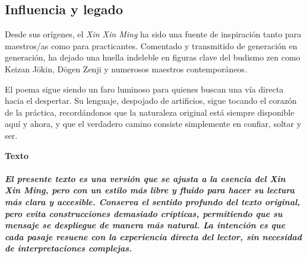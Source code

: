 \documentclass[
  a5paperpaper,
]{article}
\begin{document}
\hypertarget{influencia-y-legado}{%
\subsection{Influencia y legado}\label{influencia-y-legado}}

Desde sus orígenes, el \emph{Xin Xin Ming} ha sido una fuente de
inspiración tanto para maestros/as como para practicantes. Comentado y
transmitido de generación en generación, ha dejado una huella indeleble
en figuras clave del budismo zen como Keizan Jōkin, Dōgen Zenji y
numerosos maestros contemporáneos.

El poema sigue siendo un faro luminoso para quienes buscan una vía
directa hacia el despertar. Su lenguaje, despojado de artificios, sigue
tocando el corazón de la práctica, recordándonos que la naturaleza
original está siempre disponible aquí y ahora, y que el verdadero camino
consiste simplemente en confiar, soltar y ser.

\newpage

\begin{center}\textbf{Texto}\end{center}

\hypertarget{el-presente-texto-es-una-versiuxf3n-que-se-ajusta-a-la-esencia-del-xin-xin-ming-pero-con-un-estilo-muxe1s-libre-y-fluido-para-hacer-su-lectura-muxe1s-clara-y-accesible.-conserva-el-sentido-profundo-del-texto-original-pero-evita-construcciones-demasiado-cruxedpticas-permitiendo-que-su-mensaje-se-despliegue-de-manera-muxe1s-natural.-la-intenciuxf3n-es-que-cada-pasaje-resuene-con-la-experiencia-directa-del-lector-sin-necesidad-de-interpretaciones-complejas.}{%
\subparagraph{El presente texto es una versión que se ajusta a la
esencia del Xin Xin Ming, pero con un estilo más libre y fluido para
hacer su lectura más clara y accesible. Conserva el sentido profundo del
texto original, pero evita construcciones demasiado crípticas,
permitiendo que su mensaje se despliegue de manera más natural. La
intención es que cada pasaje resuene con la experiencia directa del
lector, sin necesidad de interpretaciones
complejas.}\label{el-presente-texto-es-una-versiuxf3n-que-se-ajusta-a-la-esencia-del-xin-xin-ming-pero-con-un-estilo-muxe1s-libre-y-fluido-para-hacer-su-lectura-muxe1s-clara-y-accesible.-conserva-el-sentido-profundo-del-texto-original-pero-evita-construcciones-demasiado-cruxedpticas-permitiendo-que-su-mensaje-se-despliegue-de-manera-muxe1s-natural.-la-intenciuxf3n-es-que-cada-pasaje-resuene-con-la-experiencia-directa-del-lector-sin-necesidad-de-interpretaciones-complejas.}}
\end{document}
